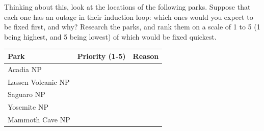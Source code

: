 \documentclass[
  letterpaper,
  DIV=11,
  numbers=noendperiod]{scrartcl}
\begin{document}
Thinking about this, look at the locations of the following parks.
Suppose that each one has an outage in their induction loop: which ones
would you expect to be fixed first, and why? Research the parks, and
rank them on a scale of 1 to 5 (1 being highest, and 5 being lowest) of
which would be fixed quickest.

\begin{longtable}[]{@{}lll@{}}
\toprule\noalign{}
Park & Priority (1-5) & Reason \\
\midrule\noalign{}
\endhead
\bottomrule\noalign{}
\endlastfoot
Acadia NP & & \\
Lassen Volcanic NP & & \\
Saguaro NP & & \\
Yosemite NP & & \\
Mammoth Cave NP & & \\
\end{longtable}
\end{document}
